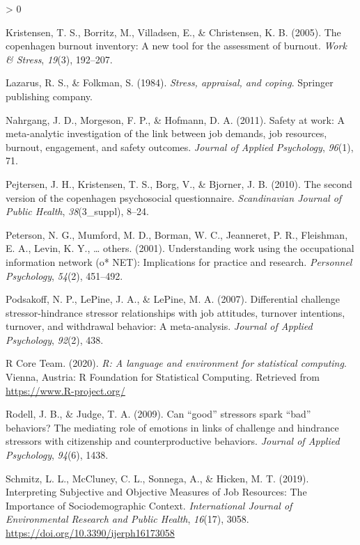 \documentclass[
  english,
  man]{apa6}
\newlength{\cslhangindent}
\newenvironment{CSLReferences}[2] %
 {%
  \setlength{\parindent}{0pt}
  \ifodd #1 \everypar{\setlength{\hangindent}{\cslhangindent}}\ignorespaces\fi
  \ifnum #2 > 0
  \setlength{\parskip}{#2\baselineskip}
  \fi
 }%
 {}
\begin{document}
\begin{CSLReferences}{1}{0}
\leavevmode\hypertarget{ref-kristensen2005copenhagen}{}%
Kristensen, T. S., Borritz, M., Villadsen, E., \& Christensen, K. B. (2005). The copenhagen burnout inventory: A new tool for the assessment of burnout. \emph{Work \& Stress}, \emph{19}(3), 192--207.

\leavevmode\hypertarget{ref-lazarus1984stress}{}%
Lazarus, R. S., \& Folkman, S. (1984). \emph{Stress, appraisal, and coping}. Springer publishing company.

\leavevmode\hypertarget{ref-nahrgang2011safety}{}%
Nahrgang, J. D., Morgeson, F. P., \& Hofmann, D. A. (2011). Safety at work: A meta-analytic investigation of the link between job demands, job resources, burnout, engagement, and safety outcomes. \emph{Journal of Applied Psychology}, \emph{96}(1), 71.

\leavevmode\hypertarget{ref-pejtersen2010second}{}%
Pejtersen, J. H., Kristensen, T. S., Borg, V., \& Bjorner, J. B. (2010). The second version of the copenhagen psychosocial questionnaire. \emph{Scandinavian Journal of Public Health}, \emph{38}(3\_suppl), 8--24.

\leavevmode\hypertarget{ref-peterson2001understanding}{}%
Peterson, N. G., Mumford, M. D., Borman, W. C., Jeanneret, P. R., Fleishman, E. A., Levin, K. Y., \ldots{} others. (2001). Understanding work using the occupational information network (o* NET): Implications for practice and research. \emph{Personnel Psychology}, \emph{54}(2), 451--492.

\leavevmode\hypertarget{ref-podsakoff2007differential}{}%
Podsakoff, N. P., LePine, J. A., \& LePine, M. A. (2007). Differential challenge stressor-hindrance stressor relationships with job attitudes, turnover intentions, turnover, and withdrawal behavior: A meta-analysis. \emph{Journal of Applied Psychology}, \emph{92}(2), 438.

\leavevmode\hypertarget{ref-R-base}{}%
R Core Team. (2020). \emph{R: A language and environment for statistical computing}. Vienna, Austria: R Foundation for Statistical Computing. Retrieved from \url{https://www.R-project.org/}

\leavevmode\hypertarget{ref-rodell2009can}{}%
Rodell, J. B., \& Judge, T. A. (2009). Can {``good''} stressors spark {``bad''} behaviors? The mediating role of emotions in links of challenge and hindrance stressors with citizenship and counterproductive behaviors. \emph{Journal of Applied Psychology}, \emph{94}(6), 1438.

\leavevmode\hypertarget{ref-schmitz_interpreting_2019}{}%
Schmitz, L. L., McCluney, C. L., Sonnega, A., \& Hicken, M. T. (2019). Interpreting {Subjective} and {Objective} {Measures} of {Job} {Resources}: {The} {Importance} of {Sociodemographic} {Context}. \emph{International Journal of Environmental Research and Public Health}, \emph{16}(17), 3058. \url{https://doi.org/10.3390/ijerph16173058}


\end{CSLReferences}
\end{document}
